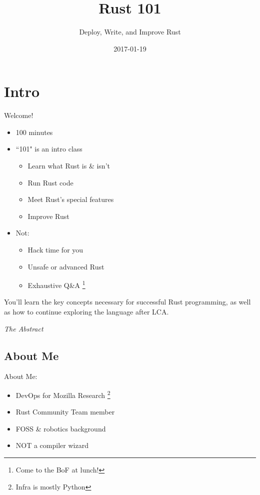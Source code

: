 \documentclass[50pt]{beamer}
\title[Rust 101]{Rust 101}
\subtitle{Deploy, Write, and Improve Rust}
\author{\name}
\date{2017-01-19}
\begin{document}
\begin{frame}
\titlepage
\end{frame}

\section{Intro}

\begin{frame}
    Welcome!
     \begin{itemize}
        \item 100 minutes
        \item ``101" is an intro class
        \begin{itemize}
            \item Learn what Rust is \& isn't
            \item Run Rust code
            \item Meet Rust's special features
            \item Improve Rust
        \end{itemize}
        \item Not:
        \begin{itemize}
            \item Hack time for you
            \item Unsafe or advanced Rust
            \item Exhaustive Q\&A \footnote{Come to the BoF at lunch!}
        \end{itemize}
    \end{itemize}
\end{frame}

\begin{frame}

\epigraph{You'll learn the key concepts necessary for successful Rust
programming, as well as how to continue exploring the language after
LCA.}{\textit{The Abstract}}

\end{frame}

\subsection{About Me}

\begin{frame}
    About Me:
    \begin{itemize}
        \item DevOps for Mozilla Research \footnote{Infra is mostly Python}
        \item Rust Community Team member
        \item FOSS \& robotics background
        \item NOT a compiler wizard
    \end{itemize}
\end{frame}
\end{document}
